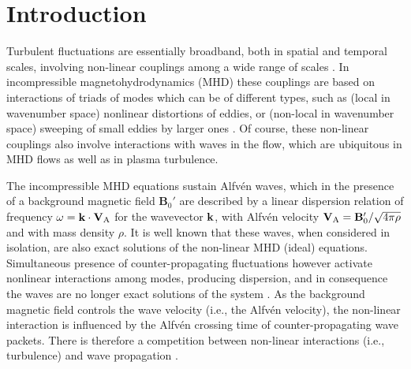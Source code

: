 \documentclass[aip,pop,reprint,amsmath,amssymb,floatfix]{revtex4-1}
\renewcommand{\vec}[1]{\mathbf{#1}}
\begin{document}
\maketitle

\section{Introduction}\label{sec_Intro}

Turbulent fluctuations are essentially broadband, both in spatial and temporal scales, involving non-linear couplings among a wide range of scales \cite{frisch_turbulence_1995}. In incompressible magnetohydrodynamics (MHD) \cite{pouquet_strong_1976, zhou_magnetohydrodynamic_2004} these couplings are based on interactions of triads of modes \cite{alexakis_turbulent_2007, mininni_scale_2011} which can be of different types, such as (local in wavenumber space) nonlinear distortions of eddies, or (non-local in wavenumber space) sweeping of small eddies by larger ones \cite{kraichnan_structure_1959, tennekes_eulerian_1975,chen_sweeping_1989, nelkin_time_1990, matthaeus_eulerian_2010, servidio_time_2011, carbone_anisotropy_2011}. Of course, these non-linear couplings also involve interactions with waves in the flow, which are ubiquitous in MHD flows as well as in plasma turbulence.

The incompressible MHD equations sustain Alfv\'en waves, which in the presence of a background magnetic field $\vec{B}_0'$ are described by a linear dispersion relation of frequency $\omega={\bf k} \cdot {\bf V}_\textrm{A}$ for the wavevector ${\bf k}$, with Alfv\'en velocity ${\bf V}_\textrm{A}={\bf B}_0'/\sqrt{4\pi \rho}$ and with mass density $\rho$. It is well known that these waves, when considered in isolation, are also exact solutions of the non-linear MHD (ideal) equations. Simultaneous presence of counter-propagating fluctuations however activate nonlinear interactions among modes, producing dispersion, and in consequence the waves are no longer exact solutions of the system \cite{dobrowolny_1980_HydromagneticTurbulence}. As the background magnetic field controls the wave velocity (i.e., the Alfv\'en velocity), the non-linear interaction is influenced by the Alfv\'en crossing time of counter-propagating wave packets. There is therefore a competition
 between non-linear interactions (i.e., turbulence) and wave propagation
\cite{dmitruk_waves_2009}.
\end{document}
